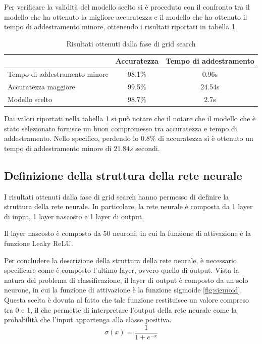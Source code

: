 Per verificare la validità del modello scelto si è proceduto con il confronto tra
il modello che ha ottenuto la migliore accuratezza e il modello che ha ottenuto
il tempo di addestramento minore, ottenendo i risultati riportati in tabella \ref{tab:ris-grid-search}.
\begin{table}[ht]
    \centering
    \begin{tabular}{@{}lcc@{}}
        \toprule
        \rowcolor[HTML]{EFEFEF}
        \multicolumn{1}{c}{\cellcolor[HTML]{EFEFEF}\textbf{Modello}} & \textbf{Accuratezza} & \textbf{Tempo di addestramento} \\ \midrule
        Tempo di addestramento minore                                & 98.1\%               & 0.96s                           \\
        Accuratezza maggiore                                         & 99.5\%               & 24.54s                          \\
        Modello scelto                                               & 98.7\%               & 2.7s                            \\ \bottomrule
    \end{tabular}
    \caption{Risultati ottenuti dalla fase di grid search}
    \label{tab:ris-grid-search}
\end{table}

Dai valori riportati nella tabella \ref{tab:ris-grid-search} si può notare che il
notare che il modello che è stato selezionato fornisce un buon compromesso tra
accuratezza e tempo di addestramento. Nello specifico, perdendo lo $0.8\%$ di
accuratezza si è ottenuto un tempo di addestramento minore di $21.84s$ secondi.

\subsection*{Definizione della struttura della rete neurale}
I risultati ottenuti dalla fase di grid search hanno permesso di definire la
struttura della rete neurale. In particolare, la rete neurale è composta da 1
layer di input, 1 layer nascosto e 1 layer di output.

Il layer nascosto è composto da 50 neuroni, in cui la funzione di attivazione è
la funzione Leaky ReLU.

Per concludere la descrizione della struttura della rete neurale, è necessario
specificare come è composto l'ultimo layer, ovvero quello di output. Vista la
natura del problema di classificazione, il layer di output è composto da un solo
neurone, in cui la funzione di attivazione è la funzione sigmoide \ref{fig:sigmoid}.
Questa scelta è dovuta al fatto che tale funzione restituisce un valore compreso
tra 0 e 1, il che permette di interpretare l'output della rete neurale come la
probabilità che l'input appartenga alla classe positiva.
\begin{equation}
    \sigma(x) = \frac{1}{1 + e^{-x}}
\end{equation}


